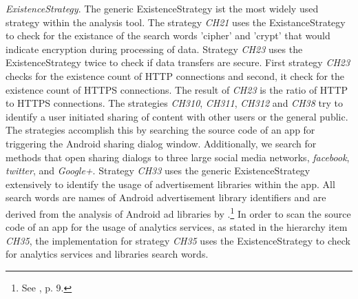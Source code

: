 \textit{ExistenceStrategy}.
The generic ExistenceStrategy ist the most widely used strategy within the analysis tool.
The strategy \textit{CH21} uses the ExistanceStrategy to check for the existance of the search words 'cipher' and 'crypt' that would indicate encryption during processing of data.
Strategy \textit{CH23} uses the ExistenceStrategy twice to check if data transfers are secure. 
First strategy \textit{CH23} checks for the existence count of HTTP connections and second, it check for the existence count of HTTPS connections.
The result of \textit{CH23} is the ratio of \acs{HTTP} to \acs{HTTPS} connections.
The strategies \textit{CH310}, \textit{CH311}, \textit{CH312} and \textit{CH38} try to identify a user initiated sharing of content with other users or the general public.
The strategies accomplish this by searching the source code of an app for triggering the Android sharing dialog window.
Additionally, we search for methods that open sharing dialogs to three large social media networks, \textit{facebook}, \textit{twitter}, and \textit{Google+}.
Strategy \textit{CH33} uses the generic ExistenceStrategy extensively to identify the usage of advertisement libraries within the app.
All search words are names of Android advertisement library identifiers and are derived from the analysis of Android ad libraries by \cite{Book2013}.\footnote{See \cite{Book2013}, p. 9.}
In order to scan the source code of an app for the usage of analytics services, as stated in the hierarchy item \textit{CH35}, the implementation for strategy \textit{CH35} uses the ExistenceStrategy to check for analytics services and libraries search words.

